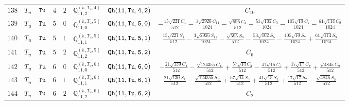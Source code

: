 \documentclass[fleqn,8pt]{jsarticle}
\begin{document}
\begin{table}[ht!]
\begin{center}
\begin{tabular}{cccccccc}
$ 138 $ & $ T_{u} $ & $ {\tt Tu} $ & $ 4 $ & $ 2 $ & $ \mathbb{Q}_{11,2}^{(h,T_{u},4)} $ & $ {\tt Qh(11,Tu,4,2)} $ & $ C_{10} $ \\
$ 139 $ & $ T_{u} $ & $ {\tt Tu} $ & $ 5 $ & $ 0 $ & $ \mathbb{Q}_{11,0}^{(h,T_{u},5)} $ & $ {\tt Qh(11,Tu,5,0)} $ & $ - \frac{15 \sqrt{221} C_{1}}{512} - \frac{3 \sqrt{2926} C_{11}}{1024} - \frac{\sqrt{595} C_{3}}{512} + \frac{53 \sqrt{102} C_{5}}{1024} - \frac{105 \sqrt{10} C_{7}}{1024} - \frac{61 \sqrt{114} C_{9}}{1024} $ \\
$ 140 $ & $ T_{u} $ & $ {\tt Tu} $ & $ 5 $ & $ 1 $ & $ \mathbb{Q}_{11,1}^{(h,T_{u},5)} $ & $ {\tt Qh(11,Tu,5,1)} $ & $ \frac{15 \sqrt{221} S_{1}}{512} - \frac{3 \sqrt{2926} S_{11}}{1024} - \frac{\sqrt{595} S_{3}}{512} - \frac{53 \sqrt{102} S_{5}}{1024} - \frac{105 \sqrt{10} S_{7}}{1024} + \frac{61 \sqrt{114} S_{9}}{1024} $ \\
$ 141 $ & $ T_{u} $ & $ {\tt Tu} $ & $ 5 $ & $ 2 $ & $ \mathbb{Q}_{11,2}^{(h,T_{u},5)} $ & $ {\tt Qh(11,Tu,5,2)} $ & $ C_{6} $ \\
$ 142 $ & $ T_{u} $ & $ {\tt Tu} $ & $ 6 $ & $ 0 $ & $ \mathbb{Q}_{11,0}^{(h,T_{u},6)} $ & $ {\tt Qh(11,Tu,6,0)} $ & $ - \frac{21 \sqrt{130} C_{1}}{512} - \frac{\sqrt{124355} C_{11}}{512} + \frac{57 \sqrt{14} C_{3}}{512} - \frac{41 \sqrt{15} C_{5}}{512} + \frac{17 \sqrt{17} C_{7}}{512} + \frac{\sqrt{4845} C_{9}}{512} $ \\
$ 143 $ & $ T_{u} $ & $ {\tt Tu} $ & $ 6 $ & $ 1 $ & $ \mathbb{Q}_{11,1}^{(h,T_{u},6)} $ & $ {\tt Qh(11,Tu,6,1)} $ & $ \frac{21 \sqrt{130} S_{1}}{512} - \frac{\sqrt{124355} S_{11}}{512} + \frac{57 \sqrt{14} S_{3}}{512} + \frac{41 \sqrt{15} S_{5}}{512} + \frac{17 \sqrt{17} S_{7}}{512} - \frac{\sqrt{4845} S_{9}}{512} $ \\
$ 144 $ & $ T_{u} $ & $ {\tt Tu} $ & $ 6 $ & $ 2 $ & $ \mathbb{Q}_{11,2}^{(h,T_{u},6)} $ & $ {\tt Qh(11,Tu,6,2)} $ & $ C_{2} $ \\
 \hline \hline
\end{tabular}
\end{center}
\end{table}
\end{document}
